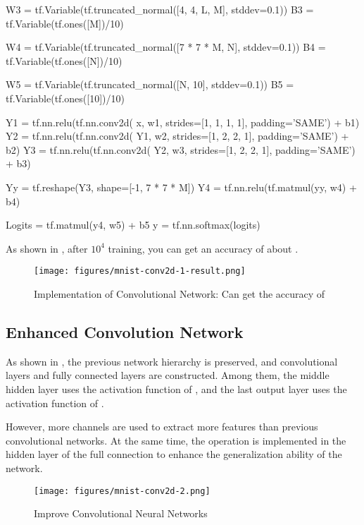 \begin{content}
\begin{content}
\begin{leftbar}
\begin{python}
W3 = tf.Variable(tf.truncated_normal([4, 4, L, M], stddev=0.1))
B3 = tf.Variable(tf.ones([M])/10)

W4 = tf.Variable(tf.truncated_normal([7 * 7 * M, N], stddev=0.1))
B4 = tf.Variable(tf.ones([N])/10)

W5 = tf.Variable(tf.truncated_normal([N, 10], stddev=0.1))
B5 = tf.Variable(tf.ones([10])/10)

Y1 = tf.nn.relu(tf.nn.conv2d(
       x, w1, strides=[1, 1, 1, 1], padding='SAME') + b1)
Y2 = tf.nn.relu(tf.nn.conv2d(
       Y1, w2, strides=[1, 2, 2, 1], padding='SAME') + b2)
Y3 = tf.nn.relu(tf.nn.conv2d(
       Y2, w3, strides=[1, 2, 2, 1], padding='SAME') + b3)

Yy = tf.reshape(Y3, shape=[-1, 7 * 7 * M])
Y4 = tf.nn.relu(tf.matmul(yy, w4) + b4)

Logits = tf.matmul(y4, w5) + b5
y = tf.nn.softmax(logits)
\end{python}
\end{leftbar}

As shown in , after $10^4$ training, you can get an accuracy of about .

\begin{figure}[H]
\centering
\texttt{[image: figures/mnist-conv2d-1-result.png]}
\caption{Implementation of Convolutional Network: Can get the accuracy of }
 \label{fig:mnist-conv2d-1-result}
\end{figure}

\subsection{Enhanced Convolution Network}

As shown in , the previous network hierarchy is preserved, and  convolutional layers and  fully connected layers are constructed. Among them, the middle hidden layer uses the activation function of , and the last output layer uses the activation function of .

However, more channels are used to extract more features than previous convolutional networks. At the same time, the  operation is implemented in the hidden layer of the full connection to enhance the generalization ability of the network.

\begin{figure}[H]
\centering
\texttt{[image: figures/mnist-conv2d-2.png]}
\caption{Improve Convolutional Neural Networks}
 \label{fig:mnist-conv2d-2}
\end{figure}


\end{content}
\end{content}
